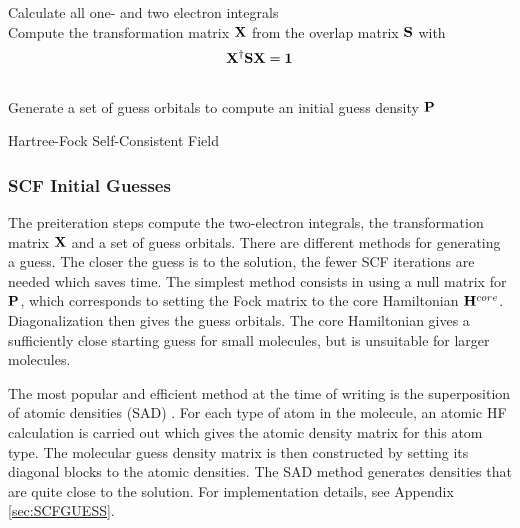 \begin{algorithm}
Calculate all one- and two electron integrals
\\
Compute the transformation matrix $\mathbf{X}$ from the overlap matrix $\mathbf{S}$ with
\begin{equation}
\mathbf{X}^{\dagger} \mathbf{SX} = \mathbf{1} 
\end{equation}
\\
Generate a set of guess orbitals to compute an initial guess density $\mathbf{P}$
\\
\caption{Hartree-Fock Self-Consistent Field}
\label{algo:SCF}
\end{algorithm}

\subsubsection{SCF Initial Guesses}

The preiteration steps compute the two-electron integrals, the transformation matrix $\mathbf{X}$ and a set of guess orbitals. There are different methods for generating a guess. The closer the guess is to the solution, the fewer SCF iterations are needed which saves time. The simplest method consists in using a null matrix for $\mathbf{P}$, which corresponds to setting the Fock matrix to the core Hamiltonian $\mathbf{H}^{core}$. Diagonalization then gives the guess orbitals. The core Hamiltonian gives a sufficiently close starting guess for small molecules, but is unsuitable for larger molecules. 

The most popular and efficient method at the time of writing is the superposition of atomic densities (SAD) \cite{Van2006}. For each type of atom in the molecule, an atomic HF calculation is carried out which gives the atomic density matrix for this atom type. The molecular guess density matrix is then constructed by setting its diagonal blocks to the atomic densities. The SAD method generates densities that are quite close to the solution. For implementation details, see Appendix \ref{sec:SCFGUESS}.

